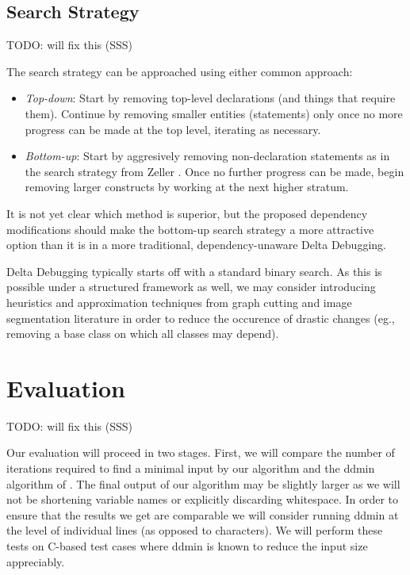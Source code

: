\documentclass[preprint]{acm_proc_article-sp}
\begin{document}
\subsection{Search Strategy}
TODO: will fix this (SSS)

The search strategy can be approached using either common approach:
\begin{itemize}
\item \emph{Top-down}: Start by removing top-level declarations (and things that
  require them). Continue by removing smaller entities (statements) only once no
  more progress can be made at the top level, iterating as necessary.
\item \emph{Bottom-up}: Start by aggresively removing non-declaration statements
  as in the search strategy from Zeller \citet{dd}. Once no further progress can
  be made, begin removing larger constructs by working at the next higher
  stratum.
\end{itemize}
It is not yet clear which method is superior, but the proposed dependency
modifications should make the bottom-up search strategy a more attractive option
than it is in a more traditional, dependency-unaware Delta Debugging.

Delta Debugging typically starts off with a standard binary search. As this is
possible under a structured framework as well, we may consider introducing
heuristics and approximation techniques from graph cutting and image
segmentation literature \citep{nc} in order to reduce the occurence of
drastic changes (eg., removing a base class on which all classes may depend).


\section{Evaluation}
TODO: will fix this (SSS)

Our evaluation will proceed in two stages.  First, we will compare the number of
iterations required to find a minimal input by our algorithm and the ddmin
algorithm of \citeauthor{dd}.  The final output of our algorithm may be slightly
larger as we will not be shortening variable names or explicitly discarding
whitespace.  In order to ensure that the results we get are comparable we will
consider running ddmin at the level of individual lines (as opposed to
characters). We will perform these tests on C-based test cases where ddmin is
known to reduce the input size appreciably.
\end{document}
